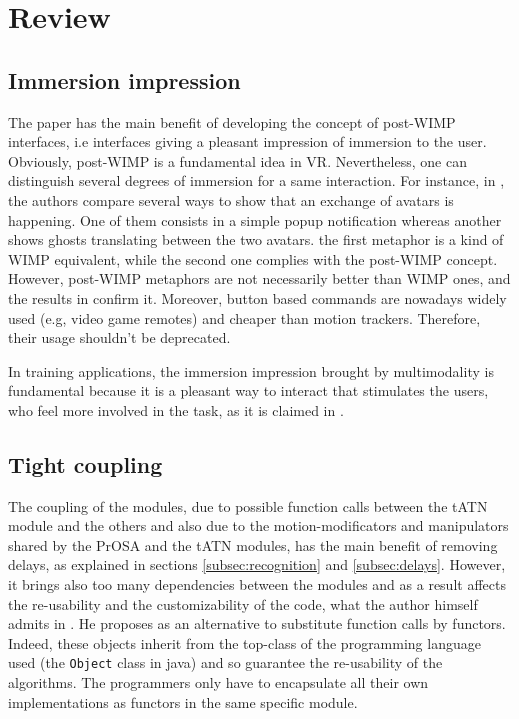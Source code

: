 \documentclass[a4paper]{article}
\begin{document}
\section{Review}

\subsection{Immersion impression}
The paper has the main benefit of developing the concept of post-WIMP interfaces, i.e interfaces giving a pleasant impression of immersion to the user. Obviously, post-WIMP is a fundamental idea in VR. Nevertheless, one can distinguish several degrees of immersion for a same interaction. For instance, in \cite{avatars}, the authors compare several ways to show that an exchange of avatars is happening. One of them consists in a simple popup notification whereas another shows ghosts translating between the two avatars. the first metaphor is a kind of WIMP equivalent, while the second one complies with the post-WIMP concept. However, post-WIMP metaphors are not necessarily better than WIMP ones, and the results in \cite{avatars} confirm it. Moreover, button based commands are nowadays widely used (e.g, video game remotes) and cheaper than motion trackers. Therefore, their usage shouldn't be deprecated.

In training applications, the immersion impression brought by multimodality is fundamental because it is a pleasant way to interact that stimulates the users, who feel more involved in the task, as it is claimed in \cite{eutap}. 

\subsection{Tight coupling}
The coupling of the modules, due to possible function calls between the tATN module and the others and also due to the motion-modificators and manipulators shared by the PrOSA and the tATN modules, has the main benefit of removing delays, as explained in sections \ref{subsec:recognition} and \ref{subsec:delays}. However, it brings also too many dependencies between the modules and as a result affects the re-usability and the customizability of the code, what the author himself admits in \cite{hcii}. He proposes as an alternative to substitute function calls by functors. Indeed, these objects inherit from the top-class of the programming language used (the \texttt{Object} class in java) and so guarantee the re-usability of the algorithms. The programmers only have to encapsulate all their own implementations as functors in the same specific module. 
\end{document}

